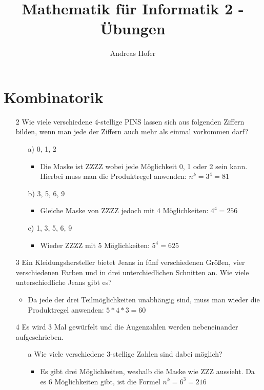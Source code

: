 \documentclass{article}
\title{\vspace{-1cm}Mathematik für Informatik 2 - Übungen}
\author{Andreas Hofer}
\begin{document}
	\maketitle
	\tableofcontents
	\section{Kombinatorik}
	\begin{itemize}
		\item[2]{Wie viele verschiedene 4-stellige PINS lassen sich aus folgenden Ziffern bilden, wenn man jede der Ziffern auch mehr als einmal vorkommen darf?}
		\begin{itemize}
			\item[a)]{0, 1, 2}
			\begin{itemize}
				\item{Die Maske ist ZZZZ wobei jede Möglichkeit 0, 1 oder 2 sein kann. Hierbei muss man die Produktregel anwenden: $n^k=3^4=81$}
			\end{itemize}
			\item[b)]{3, 5, 6, 9}
			\begin{itemize}
				\item{Gleiche Maske von ZZZZ jedoch mit 4 Möglichkeiten: $4^4=256$}
			\end{itemize}
			\item[c)]{1, 3, 5, 6, 9}
			\begin{itemize}
				\item{Wieder ZZZZ mit 5 Möglichkeiten: $5^4=625$}
			\end{itemize}
		\end{itemize}
		\item[3]{Ein Kleidungshersteller bietet Jeans in fünf verschiedenen Größen, vier verschiedenen Farben und in drei unterchiedlichen Schnitten an. Wie viele unterschiedliche Jeans gibt es?}
		\begin{itemize}
			\item{Da jede der drei Teilmöglichkeiten unabhängig sind, muss man wieder die Produktregel anwenden: $5*4*3=60$}
		\end{itemize}
		\item[4]{Es wird 3 Mal gewürfelt und die Augenzahlen werden nebeneinander aufgeschrieben.}
		\begin{itemize}
			\item[a]{Wie viele verschiedene 3-stellige Zahlen sind dabei möglich?}
			\begin{itemize}
				\item{Es gibt drei Möglichkeiten, weshalb die Maske wie ZZZ aussieht. Da es 6 Möglichkeiten gibt, ist die Formel $n^k=6^3=216$}

\end{itemize}
\end{itemize}
\end{itemize}
\end{document}

